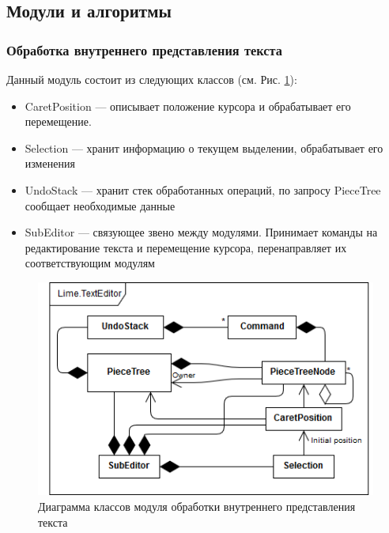 \documentclass{fefu}
\begin{document}
		\subsection{Модули и алгоритмы}
			\subsubsection{Обработка внутреннего представления текста}
				\par Данный модуль состоит из следующих классов (см. Рис. 
				\ref{diag:SubEditorScheme}):
				\begin{itemize}
					\item CaretPosition --- описывает положение курсора и 
					обрабатывает его перемещение.
					\item Selection --- хранит информацию о текущем выделении, обрабатывает его
					изменения
					\item UndoStack --- хранит стек обработанных операций, по запросу PieceTree 
					сообщает необходимые данные
					\item SubEditor --- связующее звено между модулями. Принимает команды на 
					редактирование текста и перемещение курсора, перенаправляет их
					соответствующим модулям
				\end{itemize}
				\begin{figure}[h]
					\centering
					\includegraphics[width=1\linewidth]{diagrams/SubEditorScheme.png}
					\caption{Диаграмма классов модуля обработки внутреннего 
					представления текста}
					\label{diag:SubEditorScheme}
				\end{figure}
\end{document}

